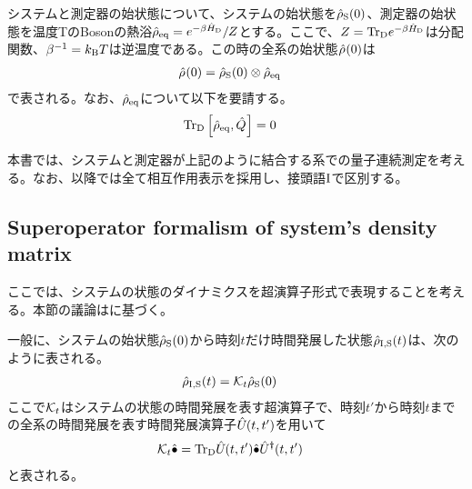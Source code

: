 \documentclass[10pt, a4paper]{jsarticle}
\begin{document}
システムと測定器の始状態について、システムの始状態を$\hat{\rho}_{\rm S}(0)$、測定器の始状態を温度TのBosonの熱浴$\hat{\rho}_{\rm eq} = e^{- \beta \hat{H}_{\rm D}} / Z$とする。ここで、$Z = {\rm Tr}_{\rm D}e^{- \beta \hat{H}_{\rm D}}$は分配関数、$\beta^{-1} = k_{\rm B} T$は逆温度である。この時の全系の始状態$\hat{\rho}_{\rm }(0)$は
\begin{equation}
\begin{split}
\label{eq:23}
	\hat{\rho}_{\rm }(0) &= \hat{\rho}_{\rm S}(0) \otimes \hat{\rho}_{\rm eq}
\end{split}
\end{equation}
で表される。なお、$\hat{\rho}_{\rm eq}$について以下を要請する。
\begin{equation}
\begin{split}
\label{eq:24}
	{\rm Tr}_{\rm D}\left[ \hat{\rho}_{\rm eq}, \hat{Q}_{} \right] &= 0
\end{split}
\end{equation}

本書では、システムと測定器が上記のように結合する系での量子連続測定を考える。なお、以降では全て相互作用表示を採用し、接頭語${\rm I}$で区別する。

\subsection{Superoperator formalism of system's density matrix}
\label{sec:22}

ここでは、システムの状態のダイナミクスを超演算子形式で表現することを考える。本節の議論は\cite{diosi1993master}に基づく。

一般に、システムの始状態$\hat{\rho}_{\rm S}(0)$から時刻$t$だけ時間発展した状態$\hat{\rho}_{\rm I,S}(t)$は、次のように表される。
\begin{equation}
\begin{split}
\label{eq:25}
	\hat{\rho}_{\rm I,S}(t) &= \mathcal{K}_{t} \hat{\rho}_{\rm S}(0)
\end{split}
\end{equation}
ここで$\mathcal{K}_{t}$はシステムの状態の時間発展を表す超演算子で、時刻$t'$から時刻$t$までの全系の時間発展を表す時間発展演算子$\hat{U}_{\rm }(t, t')$を用いて
\begin{equation}
\begin{split}
\label{eq:26}
	\mathcal{K}_{t} \hat{\bullet} &= {\rm Tr}_{\rm D}\hat{U}_{\rm }(t, t') \hat{\bullet} \hat{U}_{\rm }^{\dagger}(t, t')
\end{split}
\end{equation}
と表される。
\end{document}
